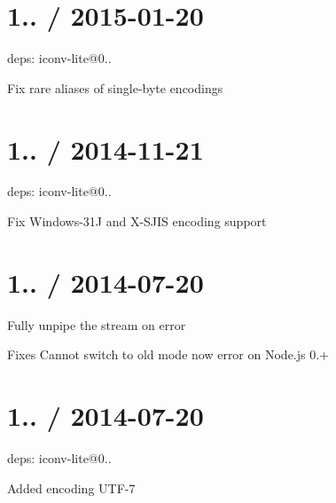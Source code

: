 \section*{1.. / 2015-\/01-\/20 }


\begin{DoxyItemize}
\item deps\+: iconv-\/lite@0..
\begin{DoxyItemize}
\item Fix rare aliases of single-\/byte encodings
\end{DoxyItemize}
\end{DoxyItemize}

\section*{1.. / 2014-\/11-\/21 }


\begin{DoxyItemize}
\item deps\+: iconv-\/lite@0..
\begin{DoxyItemize}
\item Fix Windows-\/31J and X-\/\+S\+J\+IS encoding support
\end{DoxyItemize}
\end{DoxyItemize}

\section*{1.. / 2014-\/07-\/20 }


\begin{DoxyItemize}
\item Fully unpipe the stream on error
\begin{DoxyItemize}
\item Fixes {\ttfamily Cannot switch to old mode now} error on Node.\+js 0.+
\end{DoxyItemize}
\end{DoxyItemize}

\section*{1.. / 2014-\/07-\/20 }


\begin{DoxyItemize}
\item deps\+: iconv-\/lite@0..
\begin{DoxyItemize}
\item Added encoding U\+T\+F-\/7
\end{DoxyItemize}
\end{DoxyItemize}

